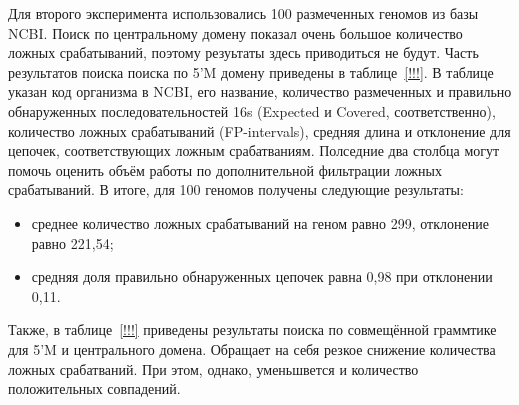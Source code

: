 \documentclass[12pt]{article}  %
\theoremstyle{remark}
\begin{document}
Для второго эксперимента использовались 100 размеченных геномов из базы NCBI.
Поиск по центральному домену показал очень большое количество ложных срабатываний, поэтому резуьтаты здесь приводиться не будут.
Часть результатов поиска поиска по 5'M домену приведены в таблице~\ref{!!!}. 
В таблице указан код организма в NCBI, его название, количество размеченных и правильно обнаруженных последовательностей 16s (Expected и Covered, соответственно), количество ложных срабатываний (FP-intervals), средняя длина и отклонение для цепочек, соответствующих ложным срабатваниям.
Полседние два столбца могут помочь оценить объём работы по дополнительной фильтрации ложных срабатываний.
В итоге, для 100 геномов получены следующие результаты:
\begin{itemize}
\item среднее количество ложных срабатываний на геном равно 299, отклонение равно 221,54;
\item средняя доля правильно обнаруженных цепочек равна 0,98 при отклонении 0,11.
\end{itemize}

Также, в таблице~\ref{!!!} приведены результаты поиска по совмещённой граммтике для 5'M и центрального домена.
Обращает на себя резкое снижение количества ложных срабатваний.
При этом, однако, уменьшвется и количество положительных совпадений.


\end{document}

